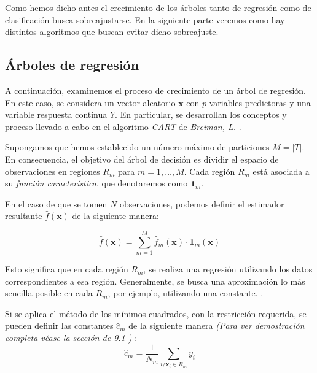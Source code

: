 \noindent Como hemos dicho antes el crecimiento de los árboles tanto de regresión como de clasificación busca sobreajustarse. En la siguiente parte veremos como hay distintos algoritmos que buscan evitar dicho sobreajuste. 

 

\subsection{Árboles de regresión }
\noindent A continuación, examinemos el  proceso de crecimiento de un árbol de regresión. En este caso, se considera un vector aleatorio $\mathbf{x}$ con $p$ variables predictoras y una variable respuesta continua $Y$. En particular, se desarrollan los conceptos y proceso llevado a cabo en el algoritmo \emph{CART} de \emph{Breiman, L.} \cite{Breiman 1984}. 

\noindent Supongamos que hemos establecido un número máximo de particiones $M=|T|$. En consecuencia, el objetivo del árbol de decisión es dividir el espacio de observaciones en regiones $R_m$ para $m=1,\ldots, M$. Cada región $R_m$ está asociada a su \emph{función característica}, que denotaremos como $\mathbf{1}_m$.

\noindent En el caso de que se tomen $N$ observaciones, podemos definir el estimador resultante $\hat{f}(\mathbf{x})$ de la siguiente manera:

\begin{equation}
\hat{f}(\mathbf{x})=\sum_{m=1}^M \hat{f}_m(\mathbf{x})\cdot \mathbf{1}_m(\mathbf{x})
\end{equation}

\noindent Esto significa que en cada región $R_m$, se realiza una regresión utilizando los datos correspondientes a esa región. Generalmente, se busca una aproximación lo más sencilla posible en cada $R_m$, por ejemplo, utilizando una constante. \cite{Hastie 2001,Biau 2016}.

\noindent Si se aplica el método de los mínimos cuadrados, con la restricción requerida, se pueden definir las constantes $\hat{c}_m$ de la siguiente manera \emph{(Para ver demostración completa véase la sección de 9.1 \cite{Breiman 1984})} :
\begin{equation}
\hat{c}_m=\dfrac{1}{N_m}\sum_{i/\mathbf{x}_i\in R_m} y_i
\end{equation}

